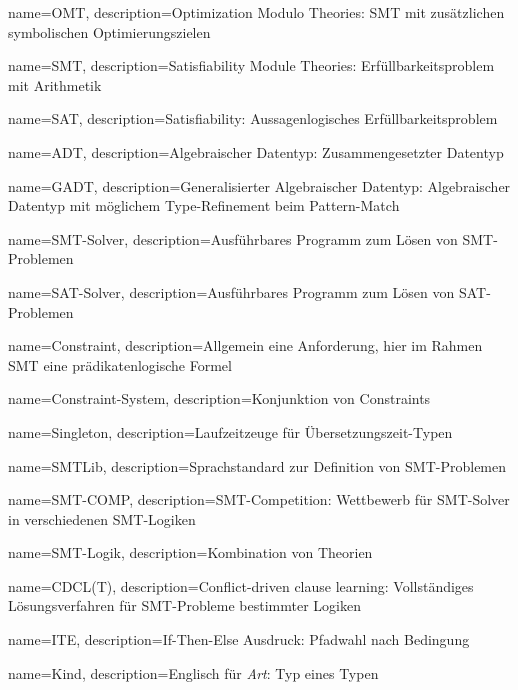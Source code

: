 {
    name=OMT,
    description={Optimization Modulo Theories: SMT mit zusätzlichen symbolischen Optimierungszielen}
}

{
    name=SMT,
    description={Satisfiability Module Theories: Erfüllbarkeitsproblem mit Arithmetik}
}

{
    name=SAT,
    description={Satisfiability: Aussagenlogisches Erfüllbarkeitsproblem}
}

{
    name=ADT,
    description={Algebraischer Datentyp: Zusammengesetzter Datentyp}
}

{
    name=GADT,
    description={Generalisierter Algebraischer Datentyp: Algebraischer Datentyp mit möglichem Type-Refinement beim Pattern-Match}
}

{
    name=SMT-Solver,
    description={Ausführbares Programm zum Lösen von SMT-Problemen}
}

{
    name=SAT-Solver,
    description={Ausführbares Programm zum Lösen von SAT-Problemen}
}

{
    name=Constraint,
    description={Allgemein eine Anforderung, hier im Rahmen SMT eine prädikatenlogische Formel}
}

{
    name=Constraint-System,
    description={Konjunktion von Constraints}
}

{
    name=Singleton,
    description={Laufzeitzeuge für Übersetzungszeit-Typen}
}

{
    name=SMTLib,
    description={Sprachstandard zur Definition von SMT-Problemen}
}

{
    name=SMT-COMP,
    description={SMT-Competition: Wettbewerb für SMT-Solver in verschiedenen SMT-Logiken}
}

{
    name=SMT-Logik,
    description={Kombination von Theorien}
}

{
    name=CDCL(T),
    description={Conflict-driven clause learning: Vollständiges Lösungsverfahren für SMT-Probleme bestimmter Logiken}
}

{
    name=ITE,
    description={If-Then-Else Ausdruck: Pfadwahl nach Bedingung}
}

{
    name=Kind,
    description={Englisch für \textit{Art}: Typ eines Typen}
}

